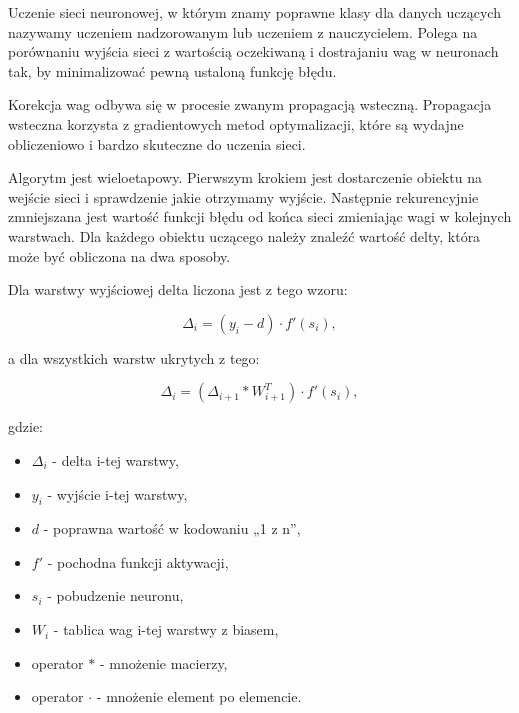     Uczenie sieci neuronowej, w którym znamy poprawne klasy dla danych uczących nazywamy uczeniem nadzorowanym lub uczeniem z nauczycielem.
    Polega na porównaniu wyjścia sieci z wartością oczekiwaną i dostrajaniu wag w neuronach tak, by minimalizować pewną ustaloną funkcję błędu.

    Korekcja wag odbywa się w procesie zwanym propagacją wsteczną.
    Propagacja wsteczna korzysta z gradientowych metod optymalizacji, które są wydajne obliczeniowo i bardzo skuteczne do uczenia sieci.
%
%
%

    Algorytm jest wieloetapowy.
    Pierwszym krokiem jest dostarczenie obiektu na wejście sieci i sprawdzenie jakie otrzymamy wyjście.
    Następnie rekurencyjnie zmniejszana jest wartość funkcji błędu od końca sieci zmieniając wagi w kolejnych warstwach.
    Dla każdego obiektu uczącego należy znaleźć wartość delty, która może być obliczona na dwa sposoby.

    Dla warstwy wyjściowej delta liczona jest z tego wzoru:

    \begin{equation}
        \Delta_i = (y_i - d) \cdot f'(s_i),
    \end{equation}

    a dla wszystkich warstw ukrytych z tego:

    \begin{equation}
        \Delta_i = (\Delta_{i+1} * W_{i+1}^T) \cdot f'(s_i),
    \end{equation}

    gdzie:
    \begin{itemize}
        \item $\Delta_i$ - delta i-tej warstwy,
        \item $y_i$ - wyjście i-tej warstwy,
        \item $d$ - poprawna wartość w kodowaniu „1 z n”,
        \item $f'$ - pochodna funkcji aktywacji,
        \item $s_i$ - pobudzenie neuronu,
        \item $W_i$ - tablica wag i-tej warstwy z biasem,
        \item operator $*$ - mnożenie macierzy,
        \item operator $\cdot$ - mnożenie element po elemencie.
    \end{itemize}

